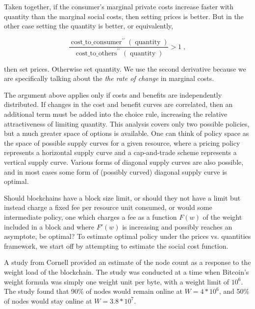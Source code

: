 \documentclass[12pt, final]{article}
\newcommand{\fname}[1]{ \operatorname{ #1 } }
\newcommand{\opname}[1]{ \operatorname{ #1 } }
\begin{document}
Taken together, if the consumer's marginal private costs increase faster with quantity than the marginal social costs, then setting prices is better. But in the other case setting the quantity is better, or equivalently,

\begin{equation}
\frac{ \fname{cost\_to\_consumer}^{\prime \prime}( \opname{quantity} ) }{ \fname{cost\_to\_others}^{\prime \prime}( \opname{quantity}) }  > 1 \; ,
\end{equation}

then set prices.  Otherwise set quantity.  We use the second derivative because we are specifically talking about the \emph{the rate of change} in marginal costs.

The argument above applies only if costs and benefits are independently distributed. If changes in the cost and benefit curves are correlated, then an additional term must be added into the choice rule, increasing the relative attractiveness of limiting quantity.  This analysis covers only two possible policies, but a much greater space of options is available.  One can think of policy space as the space of possible supply curves for a given resource, where a pricing policy represents a horizontal supply curve and a cap-and-trade scheme represents a vertical supply curve. Various forms of diagonal supply curves are also possible, and in most cases some form of (possibly curved) diagonal supply curve is optimal.

Should blockchains have a block size limit, or should they not have a limit but instead charge a fixed fee per resource unit consumed, or would some intermediate policy, one which charges a fee as a function $F(w)$ of the weight included in a block and where $F'(w)$ is increasing and possibly reaches an asymptote, be optimal? To estimate optimal policy under the prices vs. quantities framework, we start off by attempting to estimate the social cost function.

A study from Cornell provided an estimate of the node count as a response to the weight load of the blockchain. The study was conducted at a time when Bitcoin's weight formula was simply one weight unit per byte, with a weight limit of $10^6$. The study found that 90\% of nodes would remain online at $W = 4*10^6$, and 50\% of nodes would stay online at $W = 3.8 * 10^7$.
\end{document}
